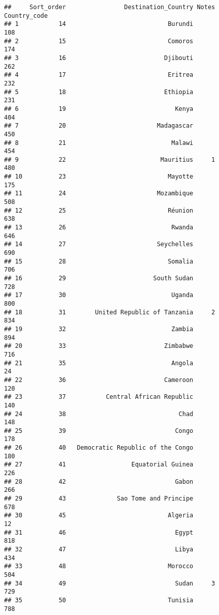 \documentclass[]{article}
\begin{document}
\begin{verbatim}
##     Sort_order                Destination_Country Notes Country_code
## 1           14                            Burundi                108
## 2           15                            Comoros                174
## 3           16                           Djibouti                262
## 4           17                            Eritrea                232
## 5           18                           Ethiopia                231
## 6           19                              Kenya                404
## 7           20                         Madagascar                450
## 8           21                             Malawi                454
## 9           22                          Mauritius     1          480
## 10          23                            Mayotte                175
## 11          24                         Mozambique                508
## 12          25                            Réunion                638
## 13          26                             Rwanda                646
## 14          27                         Seychelles                690
## 15          28                            Somalia                706
## 16          29                        South Sudan                728
## 17          30                             Uganda                800
## 18          31        United Republic of Tanzania     2          834
## 19          32                             Zambia                894
## 20          33                           Zimbabwe                716
## 21          35                             Angola                 24
## 22          36                           Cameroon                120
## 23          37           Central African Republic                140
## 24          38                               Chad                148
## 25          39                              Congo                178
## 26          40   Democratic Republic of the Congo                180
## 27          41                  Equatorial Guinea                226
## 28          42                              Gabon                266
## 29          43              Sao Tome and Principe                678
## 30          45                            Algeria                 12
## 31          46                              Egypt                818
## 32          47                              Libya                434
## 33          48                            Morocco                504
## 34          49                              Sudan     3          729
## 35          50                            Tunisia                788

\end{verbatim}
\end{document}
